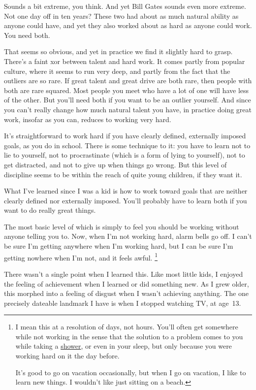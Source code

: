 Sounds a bit extreme, you think. And yet Bill Gates sounds even more
extreme. Not one day off in ten years? These two had about as much
natural ability as anyone could have, and yet they also worked about as
hard as anyone could work. You need both.

That seems so obvious, and yet in practice we find it slightly hard to
grasp. There's a faint xor between talent and hard work. It comes partly
from popular culture, where it seems to run very deep, and partly from
the fact that the outliers are so rare. If great talent and great drive
are both rare, then people with both are rare squared. Most people you
meet who have a lot of one will have less of the other. But you'll need
both if you want to be an outlier yourself. And since you can't really
change how much natural talent you have, in practice doing great work,
insofar as you can, reduces to working very hard.

It's straightforward to work hard if you have clearly defined,
externally imposed goals, as you do in school. There is some technique
to it: you have to learn not to lie to yourself, not to procrastinate
(which is a form of lying to yourself), not to get distracted, and not
to give up when things go wrong. But this level of discipline seems to
be within the reach of quite young children, if they want it.

What I've learned since I was a kid is how to work toward goals that are
neither clearly defined nor externally imposed. You'll probably have to
learn both if you want to do really great things.

The most basic level of which is simply to feel you should be working
without anyone telling you to. Now, when I'm not working hard, alarm
bells go off. I can't be sure I'm getting anywhere when I'm working
hard, but I can be sure I'm getting nowhere when I'm not, and it feels
awful. \footnote{I mean this at a resolution of days, not hours. You'll often get
somewhere while not working in the sense that the solution to a problem
comes to you while taking a \href{top.html}{shower}, or even in your
sleep, but only because you were working hard on it the day before.

It's good to go on vacation occasionally, but when I go on vacation, I
like to learn new things. I wouldn't like just sitting on a beach.}

There wasn't a single point when I learned this. Like most little kids,
I enjoyed the feeling of achievement when I learned or did something
new. As I grew older, this morphed into a feeling of disgust when I
wasn't achieving anything. The one precisely dateable landmark I have is
when I stopped watching TV, at age~13.

